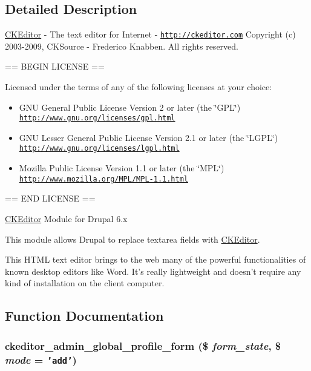 \subsection{Detailed Description}
\hyperlink{classCKEditor}{CKEditor} - The text editor for Internet - \href{http://ckeditor.com}{\tt http://ckeditor.com} Copyright (c) 2003-2009, CKSource - Frederico Knabben. All rights reserved.

== BEGIN LICENSE ==

Licensed under the terms of any of the following licenses at your choice:

\begin{itemize}
\item GNU General Public License Version 2 or later (the \char`\"{}GPL\char`\"{}) \href{http://www.gnu.org/licenses/gpl.html}{\tt http://www.gnu.org/licenses/gpl.html}\end{itemize}


\begin{itemize}
\item GNU Lesser General Public License Version 2.1 or later (the \char`\"{}LGPL\char`\"{}) \href{http://www.gnu.org/licenses/lgpl.html}{\tt http://www.gnu.org/licenses/lgpl.html}\end{itemize}


\begin{itemize}
\item Mozilla Public License Version 1.1 or later (the \char`\"{}MPL\char`\"{}) \href{http://www.mozilla.org/MPL/MPL-1.1.html}{\tt http://www.mozilla.org/MPL/MPL-1.1.html}\end{itemize}


== END LICENSE ==

\hyperlink{classCKEditor}{CKEditor} Module for Drupal 6.x

This module allows Drupal to replace textarea fields with \hyperlink{classCKEditor}{CKEditor}.

This HTML text editor brings to the web many of the powerful functionalities of known desktop editors like Word. It's really lightweight and doesn't require any kind of installation on the client computer. 

\subsection{Function Documentation}
\hypertarget{ckeditor_8admin_8inc_a0cc22572ab6628e086774f428c3c975}{
\subsubsection[{ckeditor\_\-admin\_\-global\_\-profile\_\-form}]{\setlength{\rightskip}{0pt plus 5cm}ckeditor\_\-admin\_\-global\_\-profile\_\-form (\$ {\em form\_\-state}, \/  \$ {\em mode} = {\tt 'add'})}}
\label{ckeditor_8admin_8inc_a0cc22572ab6628e086774f428c3c975}




